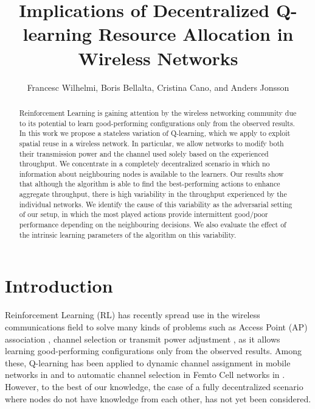 \documentclass{article}
\begin{document}
	
	\title{Implications of Decentralized Q-learning Resource Allocation in Wireless Networks}
	
	\author{Francesc Wilhelmi, Boris Bellalta, Cristina Cano, and Anders Jonsson}
	\date{ }
	\maketitle
	
	\begin{abstract}
		Reinforcement Learning is gaining attention by the wireless networking community due to its potential to learn good-performing configurations only from the observed results. In this work we propose a stateless variation of Q-learning, which we apply to exploit spatial reuse in a wireless network. In particular, we allow networks to modify both their transmission power and the channel used solely based on the experienced throughput. We concentrate in a completely decentralized scenario in which no information about neighbouring nodes is available to the learners. Our results show that although the algorithm is able to find the best-performing actions to enhance aggregate throughput, there is high variability in the throughput experienced by the individual networks.
		We identify the cause of this variability as the adversarial setting of our setup, in which the most played actions provide intermittent good/poor performance depending on the neighbouring decisions. We also evaluate the effect of the intrinsic learning parameters of the algorithm on this variability.		
	\end{abstract}
	
	\section{Introduction}
	Reinforcement Learning (RL) has recently spread use in the wireless communications field to solve many kinds of problems such as Access Point (AP) association \cite{chen2010ap}, channel selection \cite{maghsudi2015channel} or transmit power adjustment \cite{maghsudi2015joint}, as it allows learning good-performing configurations only from the observed results. Among these, Q-learning has been applied to dynamic channel assignment in mobile networks in \cite{nie1999qlearning} and to automatic channel selection in Femto Cell networks in \cite{bennis2010q}. However, to the best of our knowledge, the case of a fully decentralized scenario where nodes do not have knowledge from each other, has not yet been considered.  
	
\end{document}
